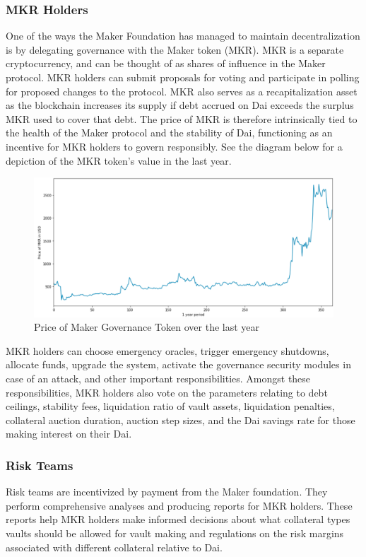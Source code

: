 \documentclass[bsc,frontabs,singlespacing,parskip,deptreport]{infthesis}
\begin{document}
    \subsubsection{MKR Holders}
    One of the ways  the Maker Foundation has managed to maintain decentralization is by delegating governance with the Maker token (MKR). MKR is a separate cryptocurrency, and can be thought of as shares of influence in the Maker protocol. MKR holders can submit proposals for voting and participate in polling for proposed changes to the protocol. MKR also serves as a recapitalization asset as the blockchain increases its supply if debt accrued on Dai exceeds the surplus MKR used to cover that debt. The price of MKR is therefore intrinsically tied to the health of the Maker protocol and the stability of Dai, functioning as an incentive for MKR holders to govern responsibly. See the diagram below for a depiction of the MKR token's value in the last year. 
    \begin{figure}[h]
            \centering
         \includegraphics[width=\linewidth]{Images and Figures/mkrprice.png}
              \caption{Price of Maker Governance Token over the last year}
    \end{figure}
    \smallbreak \noindent 
    MKR holders can choose emergency oracles, trigger emergency shutdowns, allocate funds, upgrade the system, activate the governance security modules in case of an attack, and other important responsibilities. Amongst these responsibilities, MKR holders also vote on the parameters relating to debt ceilings, stability fees, liquidation ratio of vault assets, liquidation penalties, collateral auction duration, auction step sizes, and the Dai savings rate for those making interest on their Dai. 
    \subsubsection{Risk Teams}
    Risk teams are incentivized by payment from the Maker foundation. They perform comprehensive analyses and producing reports for MKR holders. These reports help MKR holders make informed decisions about what collateral types vaults should be allowed for vault making and regulations on the risk margins associated with different collateral relative to Dai. 
\end{document}
